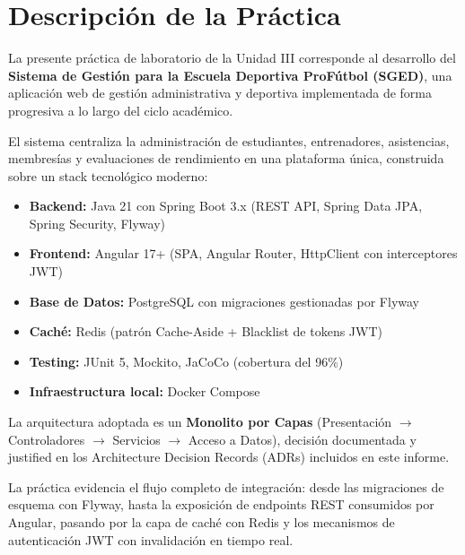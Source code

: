\documentclass[12pt]{article}
\begin{document}
	\newpage
	
	\tableofcontents
	\newpage
	
	\section{Descripción de la Práctica}
	
	La presente práctica de laboratorio de la Unidad III corresponde al desarrollo del \textbf{Sistema de Gestión para la Escuela Deportiva ProFútbol (SGED)}, una aplicación web de gestión administrativa y deportiva implementada de forma progresiva a lo largo del ciclo académico.
	
	El sistema centraliza la administración de estudiantes, entrenadores, asistencias, membresías y evaluaciones de rendimiento en una plataforma única, construida sobre un stack tecnológico moderno:
	
	\begin{itemize}
		\item \textbf{Backend:} Java 21 con Spring Boot 3.x (REST API, Spring Data JPA, Spring Security, Flyway)
		\item \textbf{Frontend:} Angular 17+ (SPA, Angular Router, HttpClient con interceptores JWT)
		\item \textbf{Base de Datos:} PostgreSQL con migraciones gestionadas por Flyway
		\item \textbf{Caché:} Redis (patrón Cache-Aside + Blacklist de tokens JWT)
		\item \textbf{Testing:} JUnit 5, Mockito, JaCoCo (cobertura del 96\%)
		\item \textbf{Infraestructura local:} Docker Compose
	\end{itemize}
	
	La arquitectura adoptada es un \textbf{Monolito por Capas} (Presentación $\rightarrow$ Controladores $\rightarrow$ Servicios $\rightarrow$ Acceso a Datos), decisión documentada y justified en los Architecture Decision Records (ADRs) incluidos en este informe.
	
	La práctica evidencia el flujo completo de integración: desde las migraciones de esquema con Flyway, hasta la exposición de endpoints REST consumidos por Angular, pasando por la capa de caché con Redis y los mecanismos de autenticación JWT con invalidación en tiempo real.
	
\end{document}
